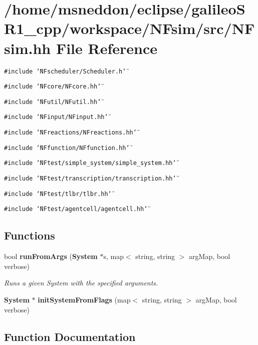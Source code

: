 \section{/home/msneddon/eclipse/galileoSR1\_\-cpp/workspace/NFsim/src/NFsim.hh File Reference}
\label{NFsim_8hh}


{\tt \#include \char`\"{}NFscheduler/Scheduler.h\char`\"{}}\par
{\tt \#include \char`\"{}NFcore/NFcore.hh\char`\"{}}\par
{\tt \#include \char`\"{}NFutil/NFutil.hh\char`\"{}}\par
{\tt \#include \char`\"{}NFinput/NFinput.hh\char`\"{}}\par
{\tt \#include \char`\"{}NFreactions/NFreactions.hh\char`\"{}}\par
{\tt \#include \char`\"{}NFfunction/NFfunction.hh\char`\"{}}\par
{\tt \#include \char`\"{}NFtest/simple\_\-system/simple\_\-system.hh\char`\"{}}\par
{\tt \#include \char`\"{}NFtest/transcription/transcription.hh\char`\"{}}\par
{\tt \#include \char`\"{}NFtest/tlbr/tlbr.hh\char`\"{}}\par
{\tt \#include \char`\"{}NFtest/agentcell/agentcell.hh\char`\"{}}\par
\subsection*{Functions}
\begin{CompactItemize}
\item 
bool {\bf runFromArgs} ({\bf System} $\ast$s, map$<$ string, string $>$ argMap, bool verbose)
\begin{CompactList}\small\item\em Runs a given System with the specified arguments. \item\end{CompactList}\item 
{\bf System} $\ast$ {\bf initSystemFromFlags} (map$<$ string, string $>$ argMap, bool verbose)
\end{CompactItemize}


\subsection{Function Documentation}

